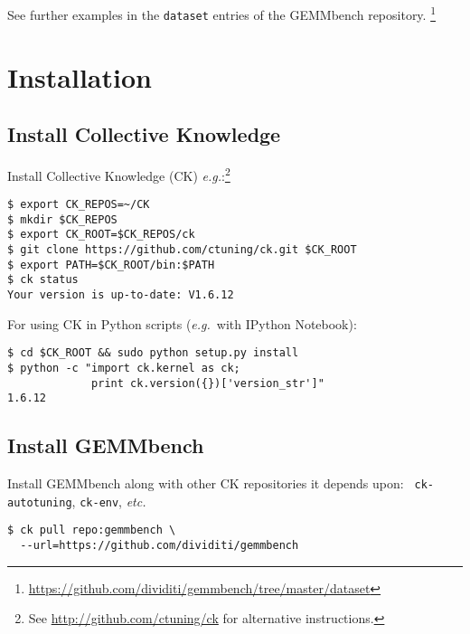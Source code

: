 \documentclass{acm_proc_article-sp} %
\begin{document}
See further examples in the {\tt dataset} entries of the GEMMbench repository.%
\footnote{\url{https://github.com/dividiti/gemmbench/tree/master/dataset}}


\section{Installation}
\label{sec:installation}

\subsection{Install Collective Knowledge}

Install Collective Knowledge (CK) {\em e.g.}:\footnote{See
\url{http://github.com/ctuning/ck} for alternative instructions.}
%
\begin{verbatim}
$ export CK_REPOS=~/CK
$ mkdir $CK_REPOS
$ export CK_ROOT=$CK_REPOS/ck
$ git clone https://github.com/ctuning/ck.git $CK_ROOT
$ export PATH=$CK_ROOT/bin:$PATH
$ ck status
Your version is up-to-date: V1.6.12
\end{verbatim}

For using CK in Python scripts ({\em e.g.}\ with IPython Notebook):
\begin{verbatim}
$ cd $CK_ROOT && sudo python setup.py install
$ python -c "import ck.kernel as ck;
             print ck.version({})['version_str']"
1.6.12
\end{verbatim}
%

\subsection{Install GEMMbench}

Install GEMMbench along with other CK repositories it depends upon: {\tt
ck-autotuning}, {\tt ck-env}, {\em etc.}
%
\begin{verbatim}
$ ck pull repo:gemmbench \
  --url=https://github.com/dividiti/gemmbench
\end{verbatim}
%

\end{document}

